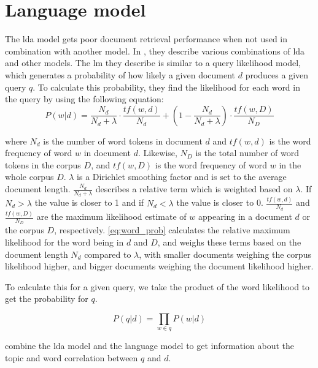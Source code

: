 \section{Language model}\label{sec:lm}
The \gls{lda} model gets poor document retrieval performance when not used in combination with another model\cite{yang2009topic}.
In \cite{yang2009topic}, they describe various combinations of \gls{lda} and other models. 
The \acrlong{lm} they describe is similar to a query likelihood model, which generates a probability of how likely a given document $d$ produces a given query $q$.
To calculate this probability, they find the likelihood for each word in the query by using the following equation:
\begin{equation}\label{eq:word_prob}
	P(w|d) = \frac{N_d}{N_d + \lambda} \cdot \frac{tf(w,d)}{N_d} + (1 - \frac{N_d}{N_d + \lambda}) \cdot \frac{tf(w,D)}{N_D}
\end{equation}

where $N_d$ is the number of word tokens in document $d$ and $tf(w,d)$ is the word frequency of word $w$ in document $d$. Likewise, $N_D$ is the total number of word tokens in the corpus $D$, and $tf(w,D)$ is the word frequency of word $w$ in the whole corpus $D$. $\lambda$ is a Dirichlet smoothing factor and is set to the average document length.
$ \frac{N_d}{N_d + \lambda} $ describes a relative term which is weighted based on $ \lambda $. If $N_d > \lambda$ the value is closer to 1 and if $ N_d < \lambda $ the value is closer to 0.
$ \frac{tf(w,d)}{N_d} $ and $\frac{tf(w,D)}{N_D}$ are the maximum likelihood estimate of $w$ appearing in a document $d$ or the corpus $D$, respectively.
\autoref{eq:word_prob} calculates the relative maximum likelihood for the word being in $ d $ and $ D $, and weighs these terms based on the document length $N_d$ compared to $\lambda$, with smaller documents weighing the corpus likelihood higher, and bigger documents weighing the document likelihood higher.

To calculate this for a given query, we take the product of the word likelihood to get the probability for $q$.

\begin{equation}\label{eq:query_prob}
	P(q|d) = \prod_{w \in q} P(w|d)
\end{equation}

\cite{yang2009topic} combine the \gls{lda} model and the language model to get information about the topic and word correlation between $q$ and $d$.
